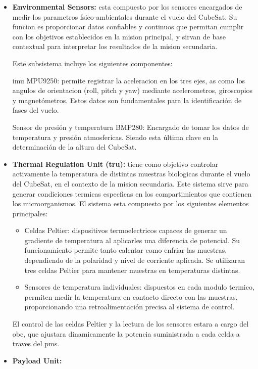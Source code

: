 \begin{itemize}
      \item \textbf{Environmental Sensors:} esta compuesto por los sensores encargados de medir los
        parametros fsico-ambientales durante el vuelo del CubeSat. Su funcion es proporcionar
        datos confiables y continuos que permitan cumplir con los objetivos establecidos en la
        mision principal, y sirvan de base contextual para interpretar los resultados de la mision
        secundaria.

        Este subsistema incluye los siguientes componentes:

        \acrfull{imu} MPU9250: permite registrar la aceleracion en los
        tres ejes, as como los angulos de orientacion (roll, pitch y yaw) mediante acelerometros,
        giroscopios y magnetómetros. Estos datos son fundamentales para la identificación de fases
        del vuelo.

        Sensor de presión y temperatura BMP280: Encargado de tomar los datos de temperatura y presión
        atmosfericas. Siendo esta última clave en la determinación de la altura del CubeSat.

      \item \textbf{Thermal Regulation Unit (\acrshort{tru}):} tiene como objetivo controlar activamente la
        temperatura de distintas muestras biologicas durante el vuelo del CubeSat, en el contexto de la
        mision secundaria. Este sistema sirve para generar condiciones termicas
        especficas en los compartimientos que contienen los microorganismos.
        El sistema esta compuesto por los siguientes elementos principales:

      \begin{itemize}
        \item Celdas Peltier: dispositivos termoelectricos capaces de generar un gradiente de
          temperatura al aplicarles una diferencia de potencial. Su funcionamiento permite
          tanto calentar como enfriar las muestras, dependiendo de la polaridad y nivel de
          corriente aplicada. Se utilizaran tres celdas Peltier para mantener muestras en
          temperaturas distintas.

        \item Sensores de temperatura individuales: dispuestos en cada modulo termico, permiten medir la
          temperatura en contacto directo con las muestras, proporcionando
            una retroalimentación precisa al sistema de control.
      \end{itemize}

      El control de las celdas Peltier y la lectura de los sensores estara a cargo del \acrshort{obc}, que
      ajustara dinamicamente la potencia suministrada a cada celda a traves del \acrshort{pms}.

      \item \textbf{Payload Unit:}

    \end{itemize}

